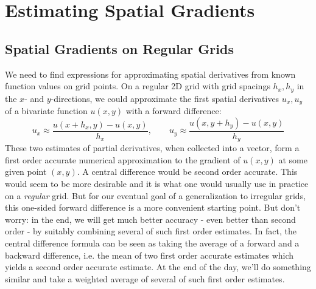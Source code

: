 \section{Estimating Spatial Gradients}
\subsection{Spatial Gradients on Regular Grids}
We need to find expressions for approximating spatial derivatives from known function values on grid points. On a regular 2D grid with grid spacings $h_x, h_y$ in the $x$- and $y$-directions, we could approximate the first spatial derivatives $u_x,u_y$ of a bivariate function $u(x,y)$ with a forward difference:
\begin{equation}
  u_x \approx \frac{u(x+h_x,y) - u(x,y)} {h_x},  \qquad
  u_y \approx \frac{u(x,y+h_y) - u(x,y)} {h_y}
\end{equation}
These two estimates of partial derivatives, when collected into a vector, form a first order accurate numerical approximation to the gradient of $u(x,y)$ at some given point $(x,y)$. A central difference would be second order accurate. This would seem to be more desirable and it is what one would usually use in practice on a \emph{regular} grid. But for our eventual goal of a generalization to irregular grids, this one-sided forward difference is a more convenient starting point. But don't worry: in the end, we will get much better accuracy - even better than second order - by suitably combining several of such first order estimates. In fact, the central difference formula can be seen as taking the average of a forward and a backward difference, i.e. the mean of two first order accurate estimates which yields a second order accurate estimate. At the end of the day, we'll do something similar and take a weighted average of several of such first order estimates.




